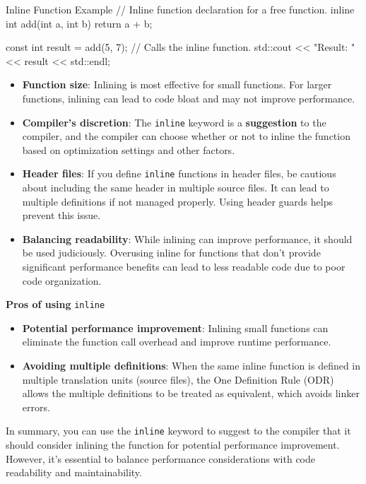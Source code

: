 \begin{neonlisting}[language=C++]{Inline Function Example}
// Inline function declaration for a free function.
inline int add(int a, int b) {
    return a + b;
}

const int result = add(5, 7); // Calls the inline function.
std::cout << "Result: " << result << std::endl;
\end{neonlisting}

\begin{itemize}
    \item \textbf{Function size}: Inlining is most effective for small functions. For larger functions, inlining can lead to code bloat and may not improve performance.
    \item \textbf{Compiler's discretion}: The \texttt{inline} keyword is a \textbf{suggestion} to the compiler, and the compiler can choose whether or not to inline the function based on optimization settings and other factors.
    \item \textbf{Header files}: If you define \texttt{inline} functions in header files, be cautious about including the same header in multiple source files. It can lead to multiple definitions if not managed properly. Using header guards helps prevent this issue.
    \item \textbf{Balancing readability}: While inlining can improve performance, it should be used judiciously. Overusing inline for functions that don't provide significant performance benefits can lead to less readable code due to poor code organization.
\end{itemize}

\textbf{Pros of using} \texttt{inline}

\begin{itemize}
    \item \textbf{Potential performance improvement}: Inlining small functions can eliminate the function call overhead and improve runtime performance.
    \item \textbf{Avoiding multiple definitions}: When the same inline function is defined in multiple translation units (source files), the One Definition Rule (ODR) allows the multiple definitions to be treated as equivalent, which avoids linker errors.
\end{itemize}

In summary, you can use the \texttt{inline} keyword to suggest to the compiler that it should consider inlining the function for potential performance improvement. However, it's essential to balance performance considerations with code readability and maintainability.

